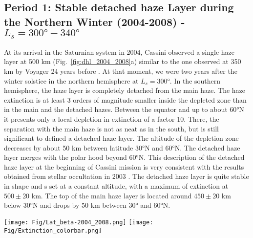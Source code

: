 \subsection{Period 1: Stable detached haze Layer during the Northern Winter (2004-2008) - $L_s=\ang{300}-\ang{340}$}

At its arrival in the Saturnian system in 2004, Cassini observed a single haze layer at 500 km
(Fig.~\ref{fig:dhl_2004_2008}a) similar to the one observed at 350 km by Voyager 24 years before
\citep{Smith1981}. At that moment, we were two years after the winter solstice in the northern hemisphere at $L_s=\ang{300}$.
In the southern hemisphere, the haze layer is completely detached from the main haze. The haze extinction is at least
3 orders of magnitude smaller inside the depleted zone than in the main and the detached hazes. Between the equator
and up to about \ang{60}N it presents only a local depletion in extinction of a factor 10. There, the separation with
the main haze is not as neat as in the south, but is still significant to defined a detached haze layer. The altitude
of the depletion zone decreases by about 50 km between latitude \ang{30}N  and \ang{60}N. The detached haze layer
merges with the polar hood beyond \ang{60}N. This description of the detached haze layer at the beginning
of Cassini mission is very consistent with the results obtained from stellar occultation in 2003 \citep{Sicardy2006}.
The detached haze layer is quite stable in shape and s set at a constant altitude, with a maximum of extinction
at $500 \pm 20$ km. The top of the main haze layer is located around $450 \pm 20$ km below \ang{30}N and drops
by 50 km between \ang{30} and \ang{60}N.

\begin{figure*}[!ht]
    \centering
    \texttt{[image: Fig/Lat\_beta-2004\_2008.png]}
    \texttt{[image: Fig/Extinction\_colorbar.png]}\vspace{-.3cm}
    \caption{Latitudinal haze extinction profile ($\beta$) retrieved for 6 images taken between 2004 and 2008
    ($L_s=\ang{300}-\ang{340}$) showing a stable DHL at $500 \pm 20$ km.
    The color schema extent is fixed for all the figures to make direct comparison
    between the different panels. The seasonal solar longitude ($L_s$) and the observation phase angle are
    also provided in each caption.}
    \label{fig:dhl_2004_2008}
\end{figure*}

